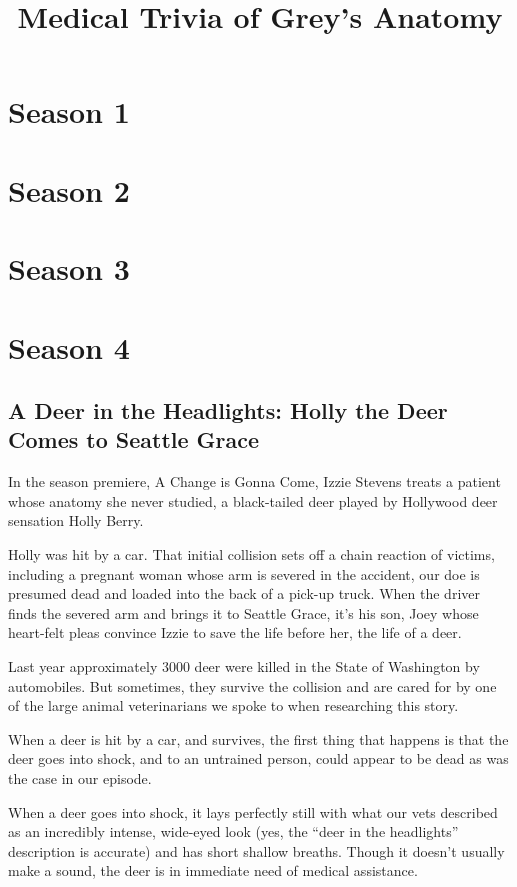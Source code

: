 \documentclass[12pt,a4paper,onecolumn]{article}
\title{Medical Trivia of Grey's Anatomy}
\author{}
\begin{document}
\date{}
\maketitle
\tableofcontents
\pagebreak
\section*{Season 1}
\section*{Season 2}
\section*{Season 3}
\section{Season 4}
\subsection{A Deer in the Headlights: Holly the Deer Comes to Seattle Grace}

In the season premiere, A Change is Gonna Come, Izzie Stevens treats a patient whose anatomy she
never studied, a black-tailed deer played by Hollywood deer sensation Holly Berry.

Holly was hit by a car. That initial collision sets off a chain reaction of victims, including a
pregnant woman whose arm is severed in the accident, our
doe\cite{doe} is presumed dead and loaded into the back of a pick-up truck.
When the driver finds the severed arm and brings it to Seattle Grace, it's his son, Joey whose
heart-felt pleas convince Izzie to save the life before her, the life of a deer.

Last year approximately 3000 deer were killed in the State of Washington by automobiles. But
sometimes, they survive the collision and are cared for by one of the large animal
veterinarians\cite{veterinary} we spoke to when researching this story.

When a deer is hit by a car, and survives, the first thing that happens is that the deer goes into
shock, and to an untrained person, could appear to be dead as was the case in our episode.

When a deer goes into shock, it lays perfectly still with what our vets described as an incredibly
intense, wide-eyed look (yes, the ``deer in the headlights'' description is accurate) and has short
shallow breaths. Though it doesn't usually make a sound, the deer is in immediate need of medical
assistance.
\end{document}

